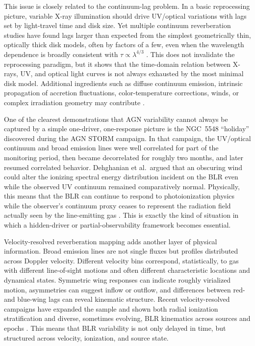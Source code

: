 \documentclass{article}
\begin{document}
This issue is closely related to the continuum-lag problem. In a basic reprocessing picture, variable X-ray illumination should drive UV/optical variations with lags set by light-travel time and disk size. Yet multiple continuum reverberation studies have found lags larger than expected from the simplest geometrically thin, optically thick disk models, often by factors of a few, even when the wavelength dependence is broadly consistent with \(\tau \propto \lambda^{4/3}\) \cite{Fausnaugh2017,Fian2023}. This does not invalidate the reprocessing paradigm, but it shows that the time-domain relation between X-rays, UV, and optical light curves is not always exhausted by the most minimal disk model. Additional ingredients such as diffuse continuum emission, intrinsic propagation of accretion fluctuations, color-temperature corrections, winds, or complex irradiation geometry may contribute \cite{Cackett2021,Fausnaugh2017,Fian2023}.

One of the clearest demonstrations that AGN variability cannot always be captured by a simple one-driver, one-response picture is the NGC~5548 ``holiday'' discovered during the AGN STORM campaign. In that campaign, the UV/optical continuum and broad emission lines were well correlated for part of the monitoring period, then became decorrelated for roughly two months, and later resumed correlated behavior. Dehghanian et al.\ argued that an obscuring wind could alter the ionizing spectral energy distribution incident on the BLR even while the observed UV continuum remained comparatively normal. Physically, this means that the BLR can continue to respond to photoionization physics while the observer's continuum proxy ceases to represent the radiation field actually seen by the line-emitting gas \cite{Dehghanian2019}. This is exactly the kind of situation in which a hidden-driver or partial-observability framework becomes essential.

Velocity-resolved reverberation mapping adds another layer of physical information. Broad emission lines are not single fluxes but profiles distributed across Doppler velocity. Different velocity bins correspond, statistically, to gas with different line-of-sight motions and often different characteristic locations and dynamical states. Symmetric wing responses can indicate roughly virialized motion, asymmetries can suggest inflow or outflow, and differences between red- and blue-wing lags can reveal kinematic structure. Recent velocity-resolved campaigns have expanded the sample and shown both radial ionization stratification and diverse, sometimes evolving, BLR kinematics across sources and epochs \cite{Wang2025,Feng2024}. This means that BLR variability is not only delayed in time, but structured across velocity, ionization, and source state.
\end{document}
